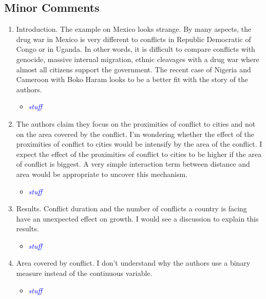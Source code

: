 \subsection{Minor Comments}

\begin{enumerate}

\item Introduction. The example on Mexico looks strange. By many aspects, the drug war in Mexico is very different to conflicts in Republic Democratic of Congo or in Uganda. In other words, it is difficult to compare conflicts with genocide, massive internal migration, ethnic cleavages with a drug war where almost all citizens support the government. The recent case of Nigeria and Cameroon with Boko Haram looks to be a better fit with the story of the authors.

\begin{itemize}
\item \textcolor{blue}{\emph{stuff}}
\end{itemize}

\item The authors claim they focus on the proximities of conflict to cities and not on the area covered by the conflict. I’m wondering whether the effect of the proximities of conflict to cities would be intensify by the area of the conflict. I expect the effect of the proximities of conflict to cities to be higher if the area of conflict is biggest. A very simple interaction term between distance and area would be appropriate to uncover this mechanism.

\begin{itemize}
\item \textcolor{blue}{\emph{stuff}}
\end{itemize}

\item Results. Conflict duration and the number of conflicts a country is facing have an unexpected effect on growth. I would see a discussion to explain this results.

\begin{itemize}
\item \textcolor{blue}{\emph{stuff}}
\end{itemize}

\item Area covered by conflict. I don’t understand why the authors use a binary measure instead of the continuous variable.

\begin{itemize}
\item \textcolor{blue}{\emph{stuff}}
\end{itemize}


\end{enumerate}
